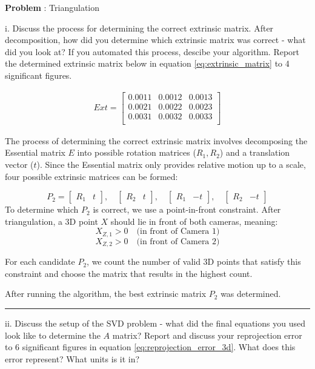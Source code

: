 \documentclass[onecolumn,10pt]{article}
\begin{document}
\addtocounter{problemnumber}{1}
\noindent\textbf{Problem }:  Triangulation

i. Discuss the process for determining the correct extrinsic matrix. After decomposition, how did you determine which extrinsic matrix was correct - what did you look at? If you automated this process, descibe your algorithm. Report the determined extrinsic matrix below in equation \ref{eq:extrinsic_matrix} to 4 significant figures.

\begin{align}
Ext=\begin{bmatrix}
0.0011 & 0.0012 & 0.0013 \\ 
0.0021 & 0.0022 & 0.0023 \\ 
0.0031 & 0.0032 & 0.0033 \\ 
\end{bmatrix}
\label{eq:extrinsic_matrix}
\end{align}


The process of determining the correct extrinsic matrix involves decomposing the Essential matrix \(E\) into possible rotation matrices (\(R_1, R_2\)) and a translation vector (\(t\)). Since the Essential matrix only provides relative motion up to a scale, four possible extrinsic matrices can be formed:

\[
P_2 = 
\begin{bmatrix}
R_1 & t
\end{bmatrix}, \quad
\begin{bmatrix}
R_2 & t
\end{bmatrix}, \quad
\begin{bmatrix}
R_1 & -t
\end{bmatrix}, \quad
\begin{bmatrix}
R_2 & -t
\end{bmatrix}
\]
To determine which \(P_2\) is correct, we use a point-in-front constraint. After triangulation, a 3D point \(X\) should lie in front of both cameras, meaning:
\[
X_{Z,1} > 0 \quad \text{(in front of Camera 1)}
\]
\[
X_{Z,2} > 0 \quad \text{(in front of Camera 2)}
\]

For each candidate \(P_2\), we count the number of valid 3D points that satisfy this constraint and choose the matrix that results in the highest count.

After running the algorithm, the best extrinsic matrix \(P_2\) was determined.

\hrule

ii. Discuss the setup of the SVD problem - what did the final equations you used look like to determine the $A$ matrix? Report and discuss your reprojection error to 6 significant figures in equation \ref{eq:reprojection_error_3d}. What does this error represent? What units is it in?
\end{document}
